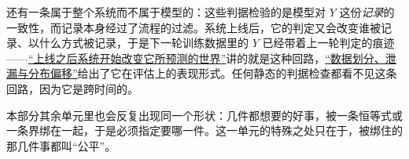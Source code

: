还有一条属于整个系统而不属于模型的：这些判据检验的是模型对 \(Y\) 这份\emph{记录}的一致性，而记录本身经过了流程的过滤。系统上线后，它的判定又会改变谁被记录、以什么方式被记录，于是下一轮训练数据里的 \(Y\) 已经带着上一轮判定的痕迹——\hyperref[sec:18-Synthesis/01-System-Lifecycle/06]{``上线之后系统开始改变它所预测的世界''}讲的就是这种回路，\hyperref[sec:13-Machine-Learning/01-Learning-Problems-and-Evaluation/04]{``数据划分、泄漏与分布偏移''}给出了它在评估上的表现形式。任何静态的判据检查都看不见这条回路，因为它是跨时间的。

本部分其余单元里也会反复出现同一个形状：几件都想要的好事，被一条恒等式或一条界绑在一起，于是必须指定要哪一件。这一单元的特殊之处只在于，被绑住的那几件事都叫``公平''。
